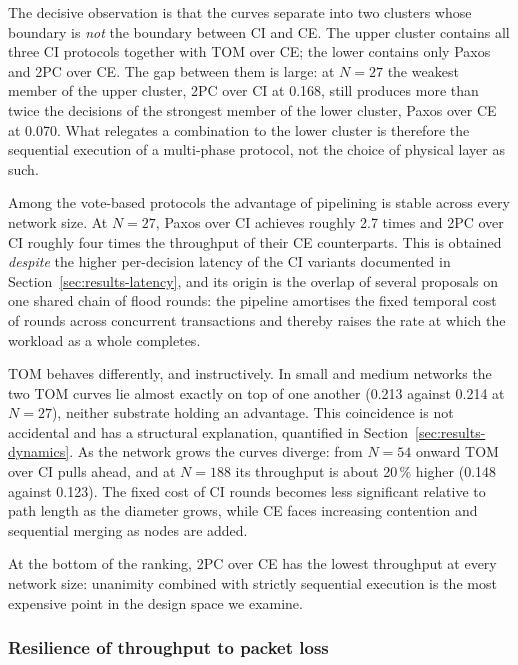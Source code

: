 \documentclass[journal]{IEEEtran}
\newcommand{\CI}{CI}                      %
\newcommand{\CE}{CE}                      %
\newcommand{\Nnodes}{N}                   %
\begin{document}
The decisive observation is that the curves separate into two clusters
whose boundary is \emph{not} the boundary between \CI{} and \CE. The
upper cluster contains all three \CI{} protocols together with TOM over
\CE; the lower contains only Paxos and 2PC over \CE. The gap between them
is large: at $\Nnodes = 27$ the weakest member of the upper cluster, 2PC
over \CI{} at 0.168, still produces more than twice the decisions of the
strongest member of the lower cluster, Paxos over \CE{} at 0.070. What
relegates a combination to the lower cluster is therefore the sequential
execution of a multi-phase protocol, not the choice of physical layer as
such.

Among the vote-based protocols the advantage of pipelining is stable
across every network size. At $\Nnodes = 27$, Paxos over \CI{} achieves
roughly 2.7 times and 2PC over \CI{} roughly four times the throughput of
their \CE{} counterparts. This is obtained \emph{despite} the higher
per-decision latency of the \CI{} variants documented in
Section~\ref{sec:results-latency}, and its origin is the overlap of
several proposals on one shared chain of flood rounds: the pipeline
amortises the fixed temporal cost of rounds across concurrent
transactions and thereby raises the rate at which the workload as a whole
completes.

TOM behaves differently, and instructively. In small and medium networks
the two TOM curves lie almost exactly on top of one another
(0.213 against 0.214 at $\Nnodes = 27$), neither substrate holding an
advantage. This coincidence is not accidental and has a structural
explanation, quantified in Section~\ref{sec:results-dynamics}. As the
network grows the curves diverge: from $\Nnodes = 54$ onward TOM over
\CI{} pulls ahead, and at $\Nnodes = 188$ its throughput is about 20\,\%
higher (0.148 against 0.123). The fixed cost of \CI{} rounds becomes less
significant relative to path length as the diameter grows, while \CE{}
faces increasing contention and sequential merging as nodes are added.

At the bottom of the ranking, 2PC over \CE{} has the lowest throughput at
every network size: unanimity combined with strictly sequential execution
is the most expensive point in the design space we examine.

\subsubsection{Resilience of throughput to packet loss}
\end{document}
